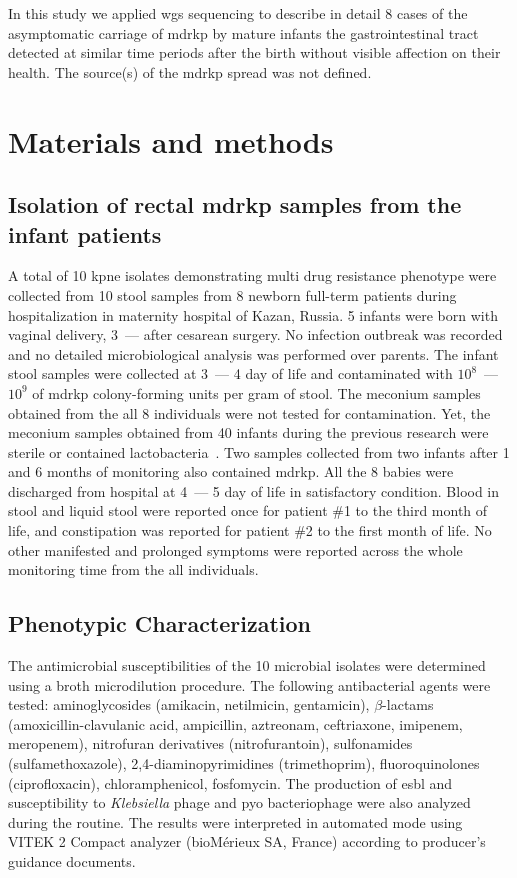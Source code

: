 \documentclass[12pt,a4paper]{article}
\newcommand{\betalactam}{$\beta$-lactam}
\begin{document}
In this study we applied \gls{wgs} sequencing to describe in detail 8 cases of the asymptomatic carriage of \gls{mdrkp}
by mature infants the gastrointestinal tract detected at similar time periods after the birth without visible affection
on their health.
The source(s) of the \gls{mdrkp} spread was not defined.

\section{Materials and methods}\label{sec:mat_met}
\subsection{Isolation of rectal \gls{mdrkp} samples from the infant patients}\label{subsec:iso}
A total of 10 \gls{kpne} isolates demonstrating multi drug resistance phenotype were collected from 10
stool samples from 8 newborn full-term patients during hospitalization in maternity hospital of Kazan, Russia.
5 infants were born with vaginal delivery, 3~--- after cesarean surgery.
No infection outbreak was recorded and no detailed microbiological analysis was performed over parents.
The infant stool samples were collected at 3~--- 4 day of life and contaminated with $10^8$~--- $10^9$ of \gls{mdrkp}
colony-forming units per gram of stool.
The meconium samples obtained from the all 8 individuals were not tested for contamination.
Yet, the meconium samples obtained from 40 infants during the previous research were sterile or
contained lactobacteria~\cite{Nikolaeva2019a}.
Two samples collected from two infants after 1 and 6 months of monitoring also contained \gls{mdrkp}.
All the 8 babies were discharged from hospital at 4~--- 5 day of life in satisfactory condition.
Blood in stool and liquid stool were reported once for patient \#1 to the third month of life,
and constipation was reported for patient \#2 to the first month of life.
No other manifested and prolonged symptoms were reported across the whole monitoring time from the all individuals.

\subsection{Phenotypic Characterization}\label{subsec:phe}
The antimicrobial susceptibilities of the 10 microbial isolates were determined using a broth microdilution procedure.
The following antibacterial agents were tested: aminoglycosides (amikacin, netilmicin, gentamicin),
\betalactam s (amoxicillin-clavulanic acid, ampicillin, aztreonam, ceftriaxone, imipenem, meropenem),
nitrofuran derivatives (nitrofurantoin), sulfonamides (sulfamethoxazole), 2,4-diaminopyrimidines (trimethoprim),
fluoroquinolones (ciprofloxacin), chloramphenicol, fosfomycin.
The production of \gls{esbl} and susceptibility to \textit{Klebsiella} phage and pyo bacteriophage
were also analyzed during the routine.
The results were interpreted in automated mode using VITEK 2 Compact analyzer (bioMérieux SA, France) according to
producer's guidance documents.
\end{document}
